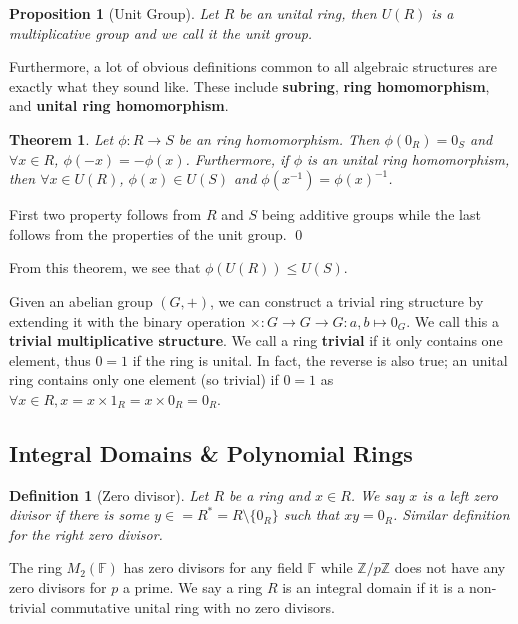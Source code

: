 \documentclass[
]{article}
\newtheorem{theorem}{Theorem}
\newtheorem{definition}{Definition}[theorem]
\newtheorem{proposition}{Proposition}[theorem]
\begin{document}
\begin{proposition}[Unit Group]
  Let \(R\) be an unital ring, then \(U(R)\) is a multiplicative group and we 
  call it the \textit{unit group}.
\end{proposition}

Furthermore, a lot of obvious definitions common to all algebraic
structures are exactly what they sound like. These include
\textbf{subring}, \textbf{ring homomorphism}, and \textbf{unital ring
homomorphism}.

\begin{theorem}
  Let \(\phi : R \to S\) be an ring homomorphism. Then \(\phi(0_R) =0_S\) and 
  \(\forall x \in R\), \(\phi(-x) = -\phi(x)\). Furthermore, if \(\phi\) is an 
  unital ring homomorphism, then \(\forall x \in U(R)\),
  \(\phi(x) \in U(S)\) and \(\phi(x^{-1}) = \phi(x)^{-1}\).
\end{theorem}
\proof

First two property follows from \(R\) and \(S\) being additive groups
while the last follows from the properties of the unit group. \qed

From this theorem, we see that \(\phi(U(R)) \le U(S)\).

Given an abelian group \((G, +)\), we can construct a trivial ring
structure by extending it with the binary operation
\(\times : G \to G \to G : a, b \mapsto 0_G\). We call this a
\textbf{trivial multiplicative structure}. We call a ring
\textbf{trivial} if it only contains one element, thus \(0 = 1\) if the
ring is unital. In fact, the reverse is also true; an unital ring
contains only one element (so trivial) if \(0 = 1\) as
\(\forall x \in R, x = x \times 1_R = x \times 0_R = 0_R\).

\hypertarget{integral-domains-polynomial-rings}{%
\subsection{Integral Domains \& Polynomial
Rings}\label{integral-domains-polynomial-rings}}

\begin{definition} [Zero divisor]
  Let \(R\) be a ring and \(x \in R\). We say \(x\) is a left zero divisor if 
  there is some \(y \in = R^* = R \setminus\{0_R\}\) such that \(xy = 0_R\). 
  Similar definition for the right zero divisor.
\end{definition}

The ring \(M_2(\mathbb{F})\) has zero divisors for any field
\(\mathbb{F}\) while \(\mathbb{Z} / p\mathbb{Z}\) does not have any zero
divisors for \(p\) a prime. We say a ring \(R\) is an integral domain if
it is a non-trivial commutative unital ring with no zero divisors.
\end{document}
